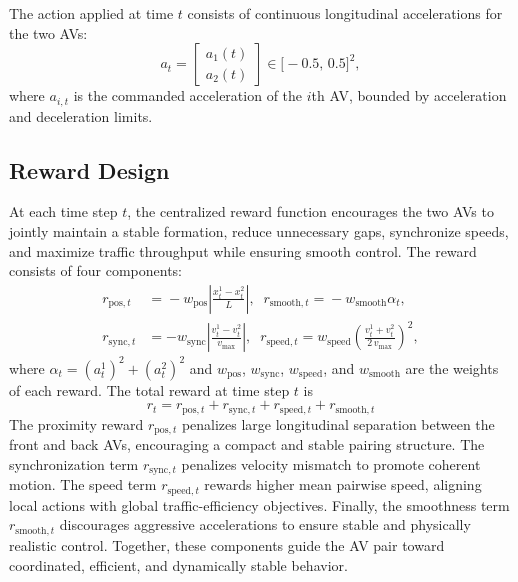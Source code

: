 \documentclass{ifacconf}
\begin{document}
The action applied at time $t$ consists of continuous longitudinal accelerations for the two AVs:
\begin{equation*}
a_t
=
\begin{bmatrix}
a_1(t) \\
a_2(t)
\end{bmatrix}
\in 
\big[-0.5,\, 0.5\big]^2,
\end{equation*}
where $a_{i,t}$ is the commanded acceleration of the $i$th AV, bounded by acceleration and deceleration limits.

\subsection{Reward Design}

At each time step $t$, the centralized reward function encourages the two AVs to jointly maintain a stable formation, reduce unnecessary gaps, synchronize speeds, and maximize traffic throughput while ensuring smooth control. 
The reward consists of four components:
\begin{align*}
r_{\mathrm{pos},t} &\!=\! 
    -w_{\mathrm{pos}}
    \left|
        \frac{x^1_t - x^2_t}{L}
    \right|,\;\; r_{\mathrm{smooth},t} \!=\! 
    -w_{\mathrm{smooth}}
    \alpha_t,\\
r_{\mathrm{sync},t} &= 
    -w_{\mathrm{sync}}
    \left|
        \frac{v^1_t - v^2_t}{v_{\max}}
    \right|,\;\;
r_{\mathrm{speed},t} = 
    w_{\mathrm{speed}}
    \left(
        \frac{v^1_t + v^2_t}{2\,v_{\max}}
    \right)^2,
\end{align*}
where $\alpha_t=(a^1_t)^2 + (a^2_t)^2$ and $w_{\mathrm{pos}}$, $w_{\mathrm{sync}}$, $w_{\mathrm{speed}}$, and $w_{\mathrm{smooth}}$ are the weights of each reward.
The total reward at time step $t$ is
\begin{equation*}
r_t = 
    r_{\mathrm{pos},t}
    + r_{\mathrm{sync},t}
    + r_{\mathrm{speed},t}
    + r_{\mathrm{smooth},t}
\end{equation*}
The proximity reward $r_{\mathrm{pos},t}$ penalizes large longitudinal 
separation between the front and back AVs, encouraging a compact and 
stable pairing structure. The synchronization term $r_{\mathrm{sync},t}$ 
penalizes velocity mismatch to promote coherent motion. The speed term 
$r_{\mathrm{speed},t}$ rewards higher mean pairwise speed, aligning local 
actions with global traffic-efficiency objectives. Finally, the smoothness 
term $r_{\mathrm{smooth},t}$ discourages aggressive accelerations to ensure 
stable and physically realistic control. Together, these components guide 
the AV pair toward coordinated, efficient, and dynamically stable behavior.
\end{document}
